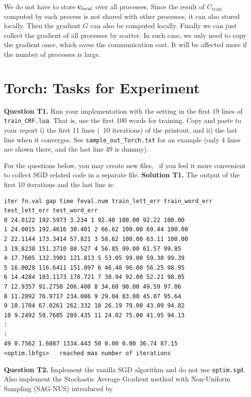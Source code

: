 \documentclass[11pt]{report}
\begin{document}
We do not have to store $\mathbf{\boldsymbol{c}}_{\text{local}}$ over all processes. Since the result of $C_{\text{train}}$ computed by each process is not shared with other processes, it can also stored locally. Then the gradient $G$ can also be computed locally. Finally we can just collect the gradient of all processes by scatter. In such case, we only need to copy the gradient once, which saves the communication cost. It will be affected more if the number of processes is large.

\section{Torch: Tasks for Experiment}

{\bf Question T1.}
Run your implementation with the setting in the first 19 lines of \verb!train_CRF.lua!.
That is, use the first 100 words for training.
Copy and paste to your report
i) the first 11 lines (\ie\ 10 iterations) of the printout,
and
ii) the last line when it converges.
%
See \verb!sample_out_Torch.txt! for an example (only 4 lines are shown there, and the last line 49 is dummy).


For the questions below, you may create new files,
\eg\ if you feel it more convenient to collect SGD related code in a separate file.
{\bf Solution T1.}
The output of the first 10 iterations and the last line is: 

\vspace{-1em}
\begin{verbatim}
iter fn.val gap time feval.num train_lett_err train_word_err test_lett_err test_word_err
0 24.0122 192.5973 3.234 1 92.40 100.00 92.22 100.00
1 24.0015 192.4616 30.401 2 66.62 100.00 69.44 100.00
2 22.1144 173.3414 57.821 3 58.62 100.00 63.11 100.00
3 19.8238 151.3710 88.527 4 56.85 99.00 61.57 99.85
4 17.7605 132.3901 121.813 5 53.05 99.00 59.30 99.39
5 16.0028 116.6411 151.097 6 46.40 96.00 56.25 98.95
6 14.4284 103.1173 178.721 7 38.94 92.00 52.21 98.05
7 12.9357 91.2750 206.400 8 34.60 90.00 49.59 97.06
8 11.2892 76.9717 234.086 9 29.04 83.00 45.07 95.64
9 10.1704 67.0261 262.332 10 26.19 79.00 43.09 94.82
10 9.2492 59.7605 289.435 11 24.02 75.00 41.95 94.13
:
:
49 0.7562 1.6087 1334.443 50 0.00 0.00 36.74 87.15
<optim.lbfgs> 	reached max number of iterations
\end{verbatim}

{\bf Question T2.}
Implement the vanilla SGD algorithm and do not use \verb!optim.sgd!.
Also implement the Stochastic Average Gradient method with Non-Uniform Sampling (SAG-NUS) introduced by
\vspace{0.5em}
\end{document}
